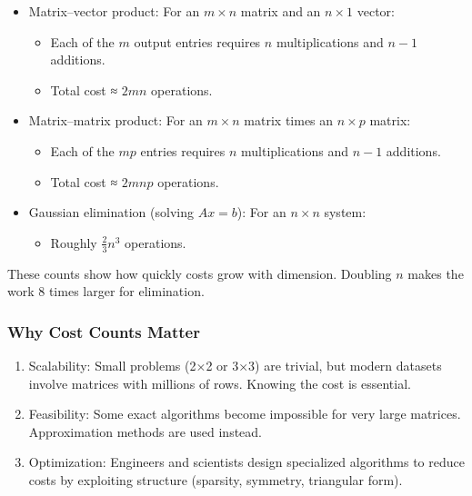 \documentclass[
  letterpaper,
  DIV=11,
  numbers=noendperiod]{scrreprt}
\providecommand{\tightlist}{%
  \setlength{\itemsep}{0pt}\setlength{\parskip}{0pt}}
\begin{document}
\begin{itemize}
\item
  Matrix--vector product: For an \(m \times n\) matrix and an
  \(n \times 1\) vector:

  \begin{itemize}
  \tightlist
  \item
    Each of the \(m\) output entries requires \(n\) multiplications and
    \(n-1\) additions.
  \item
    Total cost ≈ \(2mn\) operations.
  \end{itemize}
\item
  Matrix--matrix product: For an \(m \times n\) matrix times an
  \(n \times p\) matrix:

  \begin{itemize}
  \tightlist
  \item
    Each of the \(mp\) entries requires \(n\) multiplications and
    \(n-1\) additions.
  \item
    Total cost ≈ \(2mnp\) operations.
  \end{itemize}
\item
  Gaussian elimination (solving \(Ax=b\)): For an \(n \times n\) system:

  \begin{itemize}
  \tightlist
  \item
    Roughly \(\tfrac{2}{3}n^3\) operations.
  \end{itemize}
\end{itemize}

These counts show how quickly costs grow with dimension. Doubling \(n\)
makes the work 8 times larger for elimination.

\subsubsection{Why Cost Counts Matter}\label{why-cost-counts-matter}

\begin{enumerate}
\def\labelenumi{\arabic{enumi}.}
\tightlist
\item
  Scalability: Small problems (2×2 or 3×3) are trivial, but modern
  datasets involve matrices with millions of rows. Knowing the cost is
  essential.
\item
  Feasibility: Some exact algorithms become impossible for very large
  matrices. Approximation methods are used instead.
\item
  Optimization: Engineers and scientists design specialized algorithms
  to reduce costs by exploiting structure (sparsity, symmetry,
  triangular form).
\end{enumerate}
\end{document}
